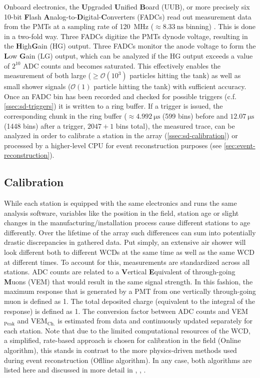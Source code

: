 Onboard electronics, the \textbf{U}pgraded \textbf{U}nified \textbf{B}oard (UUB), or more precisely six 10-bit \textbf{F}lash 
\textbf{A}nalog-to-\textbf{D}igital-\textbf{C}onverters (FADCs) read out measurement data from the PMTs at a sampling rate of \SI{120}{\mega\hertz} 
($\approx\SI{8.33}{\nano\second}$ binning) \cite{verzi2013energy}. This is done in a two-fold way. Three FADCs digitize the PMTs dynode voltage, resulting in the
\textbf{H}igh\textbf{G}ain (HG) output. Three FADCs monitor the anode voltage to form the \textbf{L}ow \textbf{G}ain (LG) output, which can be analyzed if the 
HG output exceeds a value of $2^{10}$ ADC counts and becomes saturated. This effectively enables the measurement of both large ($\geq\mathcal{O}(10^3)$ particles
hitting the tank) as well as small shower signals ($\mathcal{O}(1)$ particle hitting the tank) with sufficient accuracy. Once an FADC bin has been recorded and 
checked for possible triggers (c.f. \autoref{ssec:sd-triggers}) it is written to a ring buffer. If a trigger is issued, the corresponding chunk in the ring 
buffer ($\approx\SI{4.992}{\micro\second}$ (599 bins) before and $\SI{12.07}{\micro\second}$ (1448 bins) after a trigger, $2047 + 1$ bins total), the measured trace, 
can be analyzed in order to calibrate a station in the array (\autoref{ssec:sd-calibration}) or processed by a higher-level CPU for event reconstruction purposes 
(see \autoref{sec:event-reconstruction}).

\subsection{Calibration}
\label{ssec:sd-calibration}

While each station is equipped with the same electronics and runs the same analysis software, variables like the position in the field, station age or slight 
changes in the manufacturing/installation process cause different stations to age differently. Over the lifetime of the array such differences can sum into 
potentially drastic discrepancies in gathered data. Put simply, an extensive air shower will look different both to different WCDs at the same time as well as 
the same WCD at different times. To account for this, measurements are standardized across all stations. ADC counts are related to a \textbf{V}ertical 
\textbf{E}quivalent of through-going \textbf{M}uons (VEM) that would result in the same signal strength. In this fashion, the maximum response that is generated 
by a PMT from one vertically through-going muon is defined as \SI{1}{\Peak}. The total deposited charge (equivalent to the integral of the response) is defined 
as \SI{1}{\Charge}. The conversion factor between ADC counts and VEM$_\text{Peak}$ and VEM$_\text{Ch.}$ is estimated from data and continuously updated separately
for each station. Note that due to the limited computational resources of the WCD, a simplified, rate-based approach is chosen for calibration in the field (Online
algorithm), this stands in contrast to the more physics-driven methods used during event reconstruction (Oflline algorithm). In any case, both algorithms are 
listed here and discussed in more detail in \cite{tobiasBaseline}, \cite{bertou2006calibration}, \TODO.

